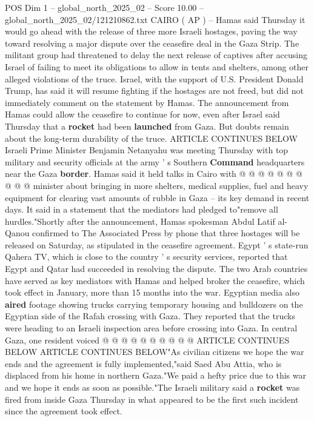 \begin{textsample}{POS Dim 1 – global\_north\_2025\_02 – Score 10.00 – global\_north\_2025\_02/121210862.txt}  \label{ex:f1_pos_444}
CAIRO ( AP ) -- Hamas said Thursday it would go ahead with the release of three more Israeli hostages, paving the way toward resolving a major dispute over the ceasefire deal in the Gaza Strip.
The militant group had threatened to delay the next release of captives after accusing Israel of failing to meet its obligations to allow in tents and shelters, among other alleged violations of the truce.
Israel, with the support of U.S.
President Donald Trump, has said it will resume fighting if the hostages are not freed, but did not immediately comment on the statement by Hamas.
The announcement from Hamas could allow the ceasefire to continue for now, even after Israel said Thursday that a \textbf{rocket} had been \textbf{launched} from Gaza.
But doubts remain about the long-term durability of the truce.
ARTICLE CONTINUES BELOW Israeli Prime Minister Benjamin Netanyahu was meeting Thursday with top military and security officials at the army ' s Southern \textbf{Command} headquarters near the Gaza \textbf{border}.
Hamas said it held talks in Cairo with @ @ @ @ @ @ @ @ @ @ minister about bringing in more shelters, medical supplies, fuel and heavy equipment for clearing vast amounts of rubble in Gaza -- its key demand in recent days.
It said in a statement that the mediators had pledged to"remove all hurdles."Shortly after the announcement, Hamas spokesman Abdul Latif al-Qanou confirmed to The Associated Press by phone that three hostages will be released on Saturday, as stipulated in the ceasefire agreement.
Egypt ' s state-run Qahera TV, which is close to the country ' s security services, reported that Egypt and Qatar had succeeded in resolving the dispute.
The two Arab countries have served as key mediators with Hamas and helped broker the ceasefire, which took effect in January, more than 15 months into the war.
Egyptian media also \textbf{aired} footage showing trucks carrying temporary housing and bulldozers on the Egyptian side of the Rafah crossing with Gaza.
They reported that the trucks were heading to an Israeli inspection area before crossing into Gaza.
In central Gaza, one resident voiced @ @ @ @ @ @ @ @ @ @ ARTICLE CONTINUES BELOW ARTICLE CONTINUES BELOW"As civilian citizens we hope the war ends and the agreement is fully implemented,"said Saed Abu Attia, who is displaced from his home in northern Gaza."We paid a hefty price due to this war and we hope it ends as soon as possible."The Israeli military said a \textbf{rocket} was fired from inside Gaza Thursday in what appeared to be the first such incident since the agreement took effect.

\end{textsample}
